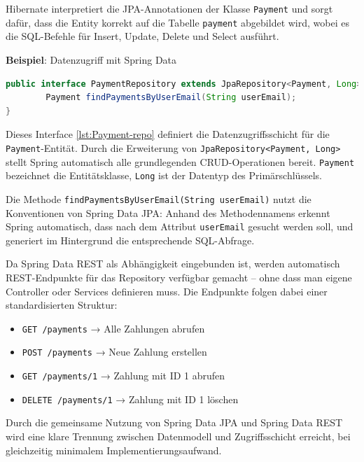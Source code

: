 \noindent Hibernate interpretiert die JPA-Annotationen der Klasse \texttt{Payment} und sorgt dafür, dass die Entity korrekt auf die Tabelle \texttt{payment} abgebildet wird, wobei es die SQL-Befehle für Insert, Update, Delete und Select ausführt.

\noindent \textbf{Beispiel}: Datenzugriff mit Spring Data
\begin{lstlisting}[language=Java, caption={Payments-Repository-Schnittstelle}, label={lst:Payment-repo}]
public interface PaymentRepository extends JpaRepository<Payment, Long> {
	    Payment findPaymentsByUserEmail(String userEmail);
}

\end{lstlisting}

\noindent Dieses Interface \ref{lst:Payment-repo} definiert die Datenzugriffsschicht für die \texttt{Payment}-Entität. Durch die Erweiterung von \texttt{JpaRepository<Payment, Long>} stellt Spring automatisch alle grundlegenden CRUD-Operationen bereit. \texttt{Payment} bezeichnet die Entitätsklasse, \texttt{Long} ist der Datentyp des Primärschlüssels.

\noindent Die Methode \texttt{findPaymentsByUserEmail(String userEmail)} nutzt die Konventionen von Spring Data JPA: Anhand des Methodennamens erkennt Spring automatisch, dass nach dem Attribut \texttt{userEmail} gesucht werden soll, und generiert im Hintergrund die entsprechende SQL-Abfrage.

\noindent Da Spring Data REST als Abhängigkeit eingebunden ist, werden automatisch REST-Endpunkte für das Repository verfügbar gemacht – ohne dass man eigene Controller oder Services definieren muss. Die Endpunkte folgen dabei einer standardisierten Struktur:

\begin{itemize}
	\item \texttt{GET /payments} → Alle Zahlungen abrufen
	\item \texttt{POST /payments} → Neue Zahlung erstellen
	\item \texttt{GET /payments/1} → Zahlung mit ID 1 abrufen
	\item \texttt{DELETE /payments/1} → Zahlung mit ID 1 löschen
\end{itemize}

\noindent Durch die gemeinsame Nutzung von Spring Data JPA und Spring Data REST wird eine klare Trennung zwischen Datenmodell und Zugriffsschicht erreicht, bei gleichzeitig minimalem Implementierungsaufwand.


